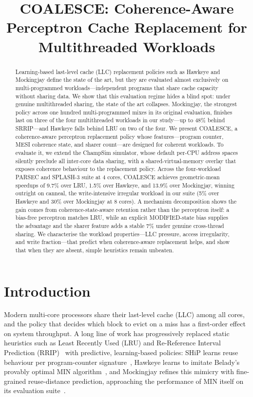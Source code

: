 \documentclass[conference]{IEEEtran}
\title{COALESCE: Coherence-Aware Perceptron Cache Replacement for Multithreaded Workloads}
\author{}
\begin{document}
\raggedbottom
\maketitle

\begin{abstract}
Learning-based last-level cache (LLC) replacement policies such as Hawkeye and Mockingjay define the state of the art, but they are evaluated almost exclusively on multi-programmed workloads---independent programs that share cache capacity without sharing data. We show that this evaluation regime hides a blind spot: under genuine multithreaded sharing, the state of the art collapses. Mockingjay, the strongest policy across one hundred multi-programmed mixes in its original evaluation, finishes last on three of the four multithreaded workloads in our study---up to 48\% behind SRRIP---and Hawkeye falls behind LRU on two of the four. We present COALESCE, a coherence-aware perceptron replacement policy whose features---program counter, MESI coherence state, and sharer count---are designed for coherent workloads. To evaluate it, we extend the ChampSim simulator, whose default per-CPU address spaces silently preclude all inter-core data sharing, with a shared-virtual-memory overlay that exposes coherence behaviour to the replacement policy. Across the four-workload PARSEC and SPLASH-3 suite at 4 cores, COALESCE achieves geometric-mean speedups of 9.7\% over LRU, 1.5\% over Hawkeye, and 13.9\% over Mockingjay, winning outright on canneal, the write-intensive irregular workload in our suite (5\% over Hawkeye and 30\% over Mockingjay at 8 cores). A mechanism decomposition shows the gain comes from coherence-state-aware retention rather than the perceptron itself: a bias-free perceptron matches LRU, while an explicit MODIFIED-state bias supplies the advantage and the sharer feature adds a stable 7\% under genuine cross-thread sharing. We characterise the workload properties---LLC pressure, access irregularity, and write fraction---that predict when coherence-aware replacement helps, and show that when they are absent, simple heuristics remain unbeaten.
\end{abstract}

\section{Introduction}

Modern multi-core processors share their last-level cache (LLC) among all cores, and the policy that decides which block to evict on a miss has a first-order effect on system throughput. A long line of work has progressively replaced static heuristics such as Least Recently Used (LRU) and Re-Reference Interval Prediction (RRIP)~\cite{jaleel2010rrip} with predictive, learning-based policies: SHiP learns reuse behaviour per program-counter signature~\cite{wu2011ship}, Hawkeye learns to imitate Belady's provably optimal MIN algorithm~\cite{belady1966study,jain2016hawkeye}, and Mockingjay refines this mimicry with fine-grained reuse-distance prediction, approaching the performance of MIN itself on its evaluation suite~\cite{shah2022mockingjay}.
\end{document}
